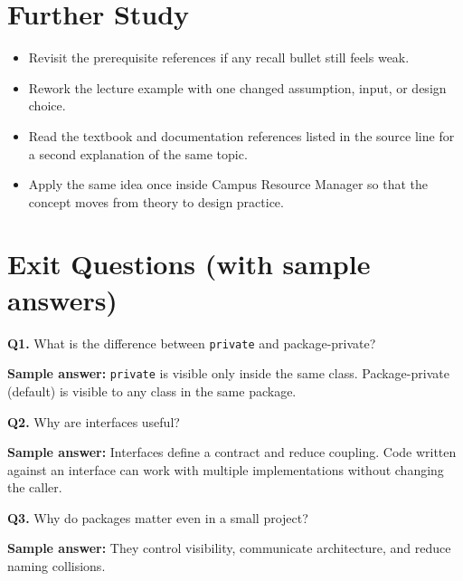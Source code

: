 \documentclass[11pt]{article}
\begin{document}
\section{Further Study}
\begin{itemize}
  \item Revisit the prerequisite references if any recall bullet still feels weak.
  \item Rework the lecture example with one changed assumption, input, or design choice.
  \item Read the textbook and documentation references listed in the source line for a second explanation of the same topic.
  \item Apply the same idea once inside Campus Resource Manager so that the concept moves from theory to design practice.
\end{itemize}
\notesources{\OOPSUnitIISources}

\section{Exit Questions (with sample answers)}
\textbf{Q1.} What is the difference between \texttt{private} and package-private?\par
\textbf{Sample answer:} \texttt{private} is visible only inside the same class. Package-private (default) is visible to any class in the same package.

\vspace{0.6em}
\textbf{Q2.} Why are interfaces useful?\par
\textbf{Sample answer:} Interfaces define a contract and reduce coupling. Code written against an interface can work with multiple implementations without changing the caller.

\vspace{0.6em}
\textbf{Q3.} Why do packages matter even in a small project?\par
\textbf{Sample answer:} They control visibility, communicate architecture, and reduce naming collisions.
\end{document}
